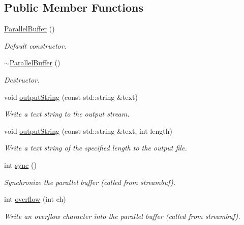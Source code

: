 \subsection*{Public Member Functions}
\begin{DoxyCompactItemize}
\item 
\hyperlink{class_c_a_r_o_m_1_1_parallel_buffer_ab2b7b484f4b3ca7fd5b94c0831a280d4}{Parallel\-Buffer} ()
\begin{DoxyCompactList}\small\item\em Default constructor. \end{DoxyCompactList}\item 
\hyperlink{class_c_a_r_o_m_1_1_parallel_buffer_a59d63b50bbf75f26af7540687a42a9d3}{$\sim$\-Parallel\-Buffer} ()
\begin{DoxyCompactList}\small\item\em Destructor. \end{DoxyCompactList}\item 
void \hyperlink{class_c_a_r_o_m_1_1_parallel_buffer_abd566a2c8afc78b3d1c97cb8c6aec460}{output\-String} (const std\-::string \&text)
\begin{DoxyCompactList}\small\item\em Write a text string to the output stream. \end{DoxyCompactList}\item 
void \hyperlink{class_c_a_r_o_m_1_1_parallel_buffer_a9be0cf7fefe904c01968a87160ce1c26}{output\-String} (const std\-::string \&text, int length)
\begin{DoxyCompactList}\small\item\em Write a text string of the specified length to the output file. \end{DoxyCompactList}\item 
int \hyperlink{class_c_a_r_o_m_1_1_parallel_buffer_a53f1cd6e167519b793e9bd830659f8c9}{sync} ()
\begin{DoxyCompactList}\small\item\em Synchronize the parallel buffer (called from streambuf). \end{DoxyCompactList}\item 
int \hyperlink{class_c_a_r_o_m_1_1_parallel_buffer_a17520235bc6ce13367a96179558d2419}{overflow} (int ch)
\begin{DoxyCompactList}\small\item\em Write an overflow character into the parallel buffer (called from streambuf). \end{DoxyCompactList}\end{DoxyCompactItemize}


